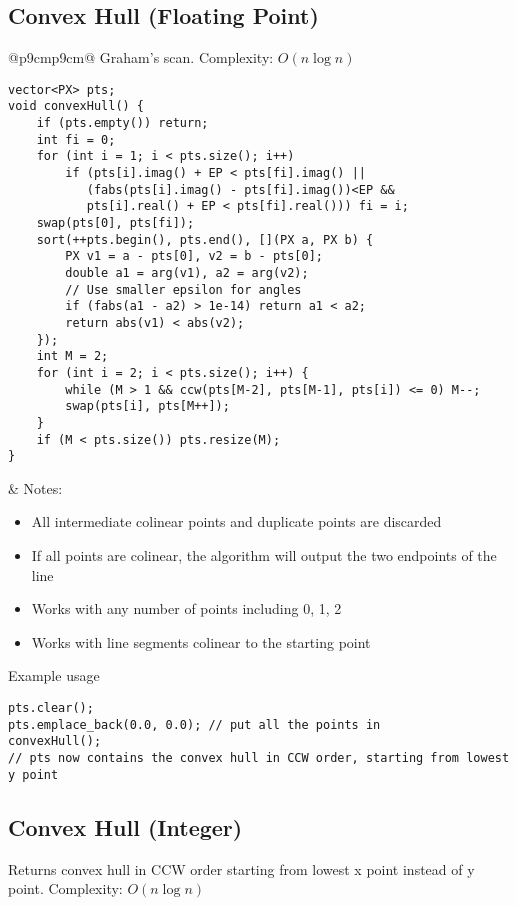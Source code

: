 \documentclass[letterpaper]{article}
\begin{document}
\clearpage
\subsection{Convex Hull (Floating Point)}

\begin{tabular}{@{}p{9cm}p{9cm}@{}}
Graham's scan. Complexity: $O\left(n\log n\right)$

\begin{lstlisting}
vector<PX> pts;
void convexHull() {
	if (pts.empty()) return;
	int fi = 0;
	for (int i = 1; i < pts.size(); i++)
		if (pts[i].imag() + EP < pts[fi].imag() || 
		   (fabs(pts[i].imag() - pts[fi].imag())<EP &&
		   pts[i].real() + EP < pts[fi].real())) fi = i;
	swap(pts[0], pts[fi]);
	sort(++pts.begin(), pts.end(), [](PX a, PX b) {
		PX v1 = a - pts[0], v2 = b - pts[0];
		double a1 = arg(v1), a2 = arg(v2);
		// Use smaller epsilon for angles
		if (fabs(a1 - a2) > 1e-14) return a1 < a2;
		return abs(v1) < abs(v2);
	});
	int M = 2;
	for (int i = 2; i < pts.size(); i++) {
		while (M > 1 && ccw(pts[M-2], pts[M-1], pts[i]) <= 0) M--;
		swap(pts[i], pts[M++]);
	}
	if (M < pts.size()) pts.resize(M);
}
\end{lstlisting}
&
Notes:
\begin{itemize}
\item All intermediate colinear points and duplicate points are discarded
\item If all points are colinear, the algorithm will output the two endpoints of the line
\item Works with any number of points including 0, 1, 2
\item Works with line segments colinear to the starting point
\end{itemize}
\end{tabular}

Example usage
\begin{lstlisting}
pts.clear();
pts.emplace_back(0.0, 0.0); // put all the points in
convexHull();
// pts now contains the convex hull in CCW order, starting from lowest y point
\end{lstlisting}

\subsection{Convex Hull (Integer)}

Returns convex hull in CCW order starting from lowest x point instead of y point. Complexity: $O\left(n\log n\right)$
\end{document}
